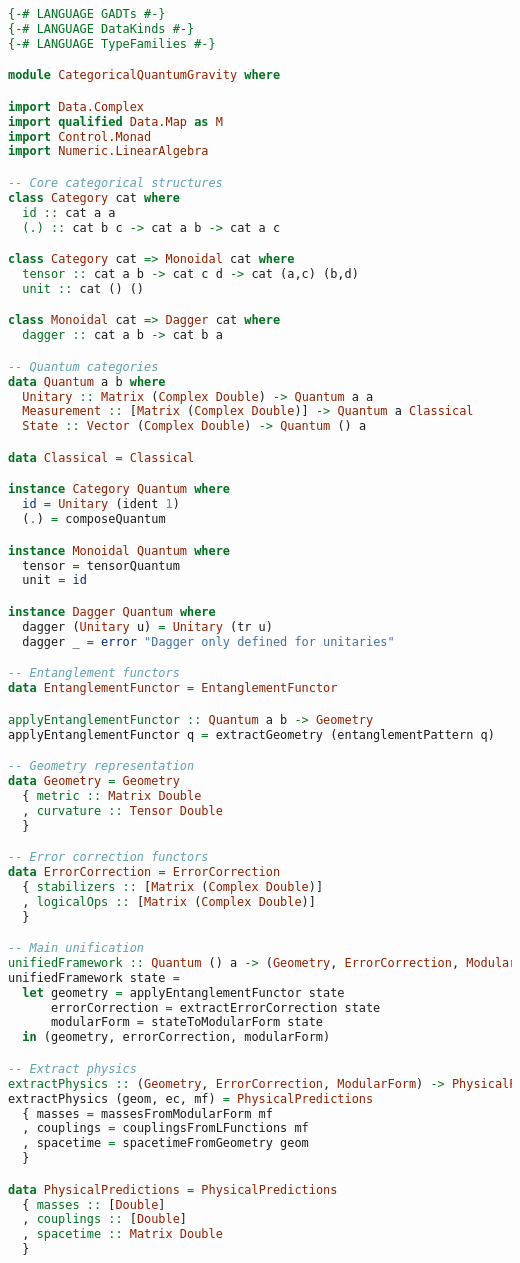 \documentclass[12pt,a4paper]{article}
\theoremstyle{plain}
\theoremstyle{definition}
\theoremstyle{remark}
\begin{document}
\begin{lstlisting}[language=Haskell, basicstyle=\small]
{-# LANGUAGE GADTs #-}
{-# LANGUAGE DataKinds #-}
{-# LANGUAGE TypeFamilies #-}

module CategoricalQuantumGravity where

import Data.Complex
import qualified Data.Map as M
import Control.Monad
import Numeric.LinearAlgebra

-- Core categorical structures
class Category cat where
  id :: cat a a
  (.) :: cat b c -> cat a b -> cat a c

class Category cat => Monoidal cat where
  tensor :: cat a b -> cat c d -> cat (a,c) (b,d)
  unit :: cat () ()

class Monoidal cat => Dagger cat where
  dagger :: cat a b -> cat b a

-- Quantum categories
data Quantum a b where
  Unitary :: Matrix (Complex Double) -> Quantum a a
  Measurement :: [Matrix (Complex Double)] -> Quantum a Classical
  State :: Vector (Complex Double) -> Quantum () a

data Classical = Classical

instance Category Quantum where
  id = Unitary (ident 1)
  (.) = composeQuantum

instance Monoidal Quantum where
  tensor = tensorQuantum
  unit = id

instance Dagger Quantum where
  dagger (Unitary u) = Unitary (tr u)
  dagger _ = error "Dagger only defined for unitaries"

-- Entanglement functors
data EntanglementFunctor = EntanglementFunctor

applyEntanglementFunctor :: Quantum a b -> Geometry
applyEntanglementFunctor q = extractGeometry (entanglementPattern q)

-- Geometry representation
data Geometry = Geometry 
  { metric :: Matrix Double
  , curvature :: Tensor Double
  }

-- Error correction functors
data ErrorCorrection = ErrorCorrection
  { stabilizers :: [Matrix (Complex Double)]
  , logicalOps :: [Matrix (Complex Double)]
  }

-- Main unification
unifiedFramework :: Quantum () a -> (Geometry, ErrorCorrection, ModularForm)
unifiedFramework state = 
  let geometry = applyEntanglementFunctor state
      errorCorrection = extractErrorCorrection state
      modularForm = stateToModularForm state
  in (geometry, errorCorrection, modularForm)

-- Extract physics
extractPhysics :: (Geometry, ErrorCorrection, ModularForm) -> PhysicalPredictions
extractPhysics (geom, ec, mf) = PhysicalPredictions
  { masses = massesFromModularForm mf
  , couplings = couplingsFromLFunctions mf
  , spacetime = spacetimeFromGeometry geom
  }

data PhysicalPredictions = PhysicalPredictions
  { masses :: [Double]
  , couplings :: [Double]
  , spacetime :: Matrix Double
  }
\end{lstlisting}
\end{document}
